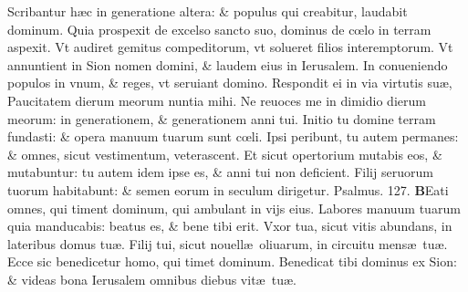 \documentclass[a5paper,10pt]{book}
\def\ae{æ}
\def\oe{œ}
\begin{document}
\begin{multicols*}{2}
\newline \color{red} S\color{black}cribantur h\ae c in generatione altera: \& populus qui creabitur, laudabit dominum.
\newline \color{red} Q\color{black}uia prospexit de excelso sancto suo, dominus de c\oe lo in terram aspexit.
\newline \color{red} V\color{black}t audiret gemitus compeditorum, vt solueret filios interemptorum.
\newline \color{red} V\color{black}t annuntient in Sion nomen domini, \& laudem eius in Ierusalem.
\newline \color{red} I\color{black}n conueniendo populos in vnum, \& reges, vt seruiant domino.
\newline \color{red} R\color{black}espondit ei in via virtutis su\ae , Paucitatem dierum meorum nuntia mihi.
\newline \color{red} N\color{black}e reuoces me in dimidio dierum meorum: in generationem, \& generationem anni tui.
\newline \color{red} I\color{black}nitio tu domine terram fundasti: \& opera manuum tuarum sunt c\oe li.
\newline \color{red} I\color{black}psi peribunt, tu autem permanes: \& omnes, sicut vestimentum, veterascent.
\newline \color{red} E\color{black}t sicut opertorium mutabis eos, \& mutabuntur: tu autem idem ipse es, \& anni tui non deficient.
\newline \color{red} F\color{black}ilij seruorum tuorum habitabunt: \& semen eorum in seculum dirigetur.
\vspace{+.5em}
\newline \color{red} Psalmus. \hypertarget{ps127}{127.} \color{black}
\vspace{-.25em}
\lettrine[lines=2]{\bfseries \color{red} B}{}Eati omnes, qui timent dominum, qui ambulant in vijs eius.
\newline \color{red} L\color{black}abores manuum tuarum quia manducabis: beatus es, \& bene tibi erit.
\newline \color{red} V\color{black}xor tua, sicut vitis abundans, in lateribus domus tu\ae .
\newline \color{red} F\color{black}ilij tui, sicut nouell\ae \ oliuarum, in circuitu mens\ae \ tu\ae .
\newline \color{red} E\color{black}cce sic benedicetur homo, qui timet dominum.
\newline \color{red} B\color{black}enedicat tibi dominus ex Sion: \& videas bona Ierusalem omnibus diebus vit\ae \ tu\ae .

\end{multicols*}
\end{document}
